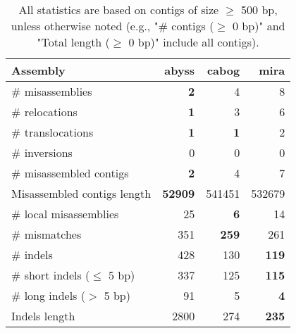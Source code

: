 \documentclass[12pt,a4paper]{article}
\begin{document}
\begin{table}[ht]
\begin{center}
\caption{All statistics are based on contigs of size $\geq$ 500 bp, unless otherwise noted (e.g., "\# contigs ($\geq$ 0 bp)" and "Total length ($\geq$ 0 bp)" include all contigs).}
\begin{tabular}{|l*{3}{|r}|}
\hline
Assembly & abyss & cabog & mira \\ \hline
\# misassemblies & {\bf 2} & 4 & 8 \\ \hline
\hspace{5mm}\# relocations & {\bf 1} & 3 & 6 \\ \hline
\hspace{5mm}\# translocations & {\bf 1} & {\bf 1} & 2 \\ \hline
\hspace{5mm}\# inversions & 0 & 0 & 0 \\ \hline
\# misassembled contigs & {\bf 2} & 4 & 7 \\ \hline
Misassembled contigs length & {\bf 52909} & 541451 & 532679 \\ \hline
\# local misassemblies & 25 & {\bf 6} & 14 \\ \hline
\# mismatches & 351 & {\bf 259} & 261 \\ \hline
\# indels & 428 & 130 & {\bf 119} \\ \hline
\hspace{5mm}\# short indels ($\leq$ 5 bp) & 337 & 125 & {\bf 115} \\ \hline
\hspace{5mm}\# long indels ($>$ 5 bp) & 91 & 5 & {\bf 4} \\ \hline
Indels length & 2800 & 274 & {\bf 235} \\ \hline
\end{tabular}
\end{center}
\end{table}
\end{document}

